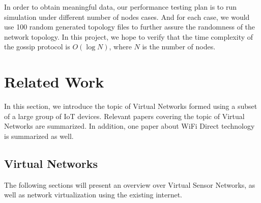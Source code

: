 \documentclass[12pt,journal]{IEEEtran}
\begin{document}
In order to obtain meaningful data, our performance testing plan is to run simulation under different number of nodes cases. And for each case, we would use 100 random generated topology files to further assure the randomness of the network topology. In this project, we hope to verify that the time complexity of the gossip protocol is $O(\log N)$, where $N$ is the number of nodes.


\section{Related Work}
In this section, we introduce the topic of Virtual Networks formed using a subset of a large group of IoT devices. Relevant papers covering the topic of Virtual Networks are summarized. In addition, one paper about WiFi Direct technology is summarized as well.

\subsection{Virtual Networks}
The following sections will present an overview over Virtual Sensor Networks, as well as network virtualization using the existing internet.
\end{document}
